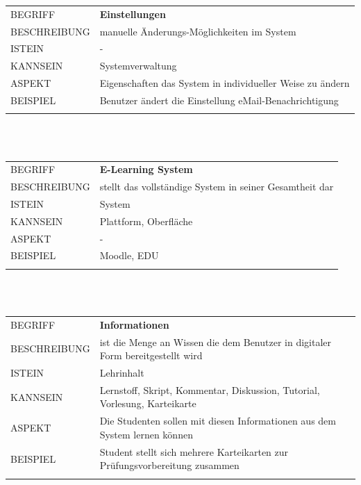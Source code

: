 \documentclass[12pt,a4paper]{article}
\begin{document}
\begin{tabular}{l p{12cm}}
BEGRIFF 	 & \textbf{Einstellungen} \\ 
BESCHREIBUNG & manuelle Änderungs-Möglichkeiten im System \\
ISTEIN   	 & -\\
KANNSEIN 	 & Systemverwaltung\\ 
ASPEKT   	 & Eigenschaften das System in individueller Weise zu ändern\\ 
BEISPIEL 	 & Benutzer ändert die Einstellung eMail-Benachrichtigung\\\\
\hline
\end{tabular}\\\\  

\begin{tabular}{l p{12cm}}
BEGRIFF 	 & \textbf{E-Learning System} \\ 
BESCHREIBUNG & stellt das vollständige System in seiner Gesamtheit dar\\ 
ISTEIN   	 & System\\
KANNSEIN 	 & Plattform, Oberfläche\\ 
ASPEKT   	 & -\\
BEISPIEL 	 & Moodle, EDU\\\\
\hline
\end{tabular}\\\\  

\begin{tabular}{l p{12cm}}
BEGRIFF 	 & \textbf{Informationen} \\ 
BESCHREIBUNG & ist die Menge an Wissen die dem Benutzer in digitaler Form bereitgestellt wird\\ 
ISTEIN   	 & Lehrinhalt\\
KANNSEIN 	 & Lernstoff, Skript, Kommentar, Diskussion, Tutorial, Vorlesung, Karteikarte\\ 
ASPEKT   	 & Die Studenten sollen mit diesen Informationen aus dem System lernen können\\
BEISPIEL 	 & Student stellt sich mehrere Karteikarten zur Prüfungsvorbereitung zusammen\\\\
\hline
\end{tabular}\\\\  
\end{document}
